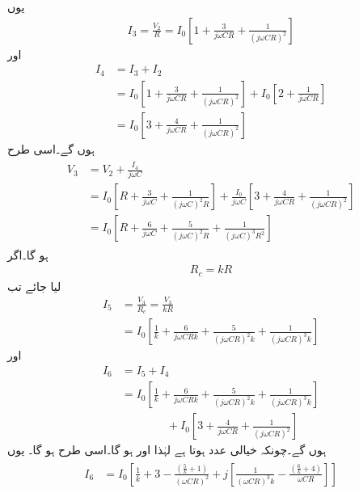 یوں
\begin{align*}
I_3=\frac{V_2}{R}=I_0 \left [1+\frac{3}{j \omega C R}+\frac{1}{\left(j \omega C R \right )^2} \right ]
\end{align*}
اور
\begin{align*}
I_4 &=I_3 +I_2\\
&=I_0 \left [1+\frac{3}{j \omega C R}+\frac{1}{\left(j \omega C R \right )^2} \right ]+I_0 \left [2+\frac{1}{j \omega C R} \right] \\
&=I_0 \left[3+\frac{4}{j \omega C R}+\frac{1}{\left (j \omega C R \right )^2} \right]
\end{align*}
ہوں گے۔اسی طرح
\begin{gather}
\begin{aligned} \label{مساوات_مزاحمت_کپیسٹر_دباو_تین}
V_3 &=V_2 +\frac{I_4}{j \omega C} \\
&=I_0 \left [R+\frac{3}{j \omega C} +\frac{1}{\left(j \omega C \right )^2 R}\right ]+ \frac{I_0}{j \omega C} \left[3+\frac{4}{j \omega C R}+\frac{1}{\left (j \omega C R \right )^2} \right] \\
&=I_0 \left[R+\frac{6}{j \omega C}+\frac{5}{\left(j \omega C \right )^2 R} +\frac{1}{\left(j \omega C \right )^3 R^2}\right]
\end{aligned}
\end{gather}
ہو گا۔اگر
\begin{align}
R_c = k R
\end{align}
لیا جائے تب
\begin{align*}
I_5 &= \frac{V_3}{R_c} =\frac{V_3}{k R}\\ 
&= I_0 \left[\frac{1}{k}+\frac{6}{j \omega C R k}+\frac{5}{\left(j \omega C  R\right )^2 k} +\frac{1}{\left(j \omega C  R\right )^3 k}\right]
\end{align*}
اور
\begin{align*}
I_6 &=I_5 + I_4 \\
&=I_0 \left[\frac{1}{k}+\frac{6}{j \omega C R k}+\frac{5}{\left(j \omega C  R\right )^2 k} +\frac{1}{\left(j \omega C  R\right )^3 k}\right] \\
& \qquad \qquad +I_0 \left[3+\frac{4}{j \omega C R}+\frac{1}{\left (j \omega C R \right )^2} \right]
\end{align*}
ہوں گے۔چونکہ خیالی عدد  ہوتا ہے لہٰذا  اور  ہو گا۔اسی طرح  ہو گا۔ یوں
\begin{gather}
\begin{aligned} \label{مساوات_مزاحمت_کپیسٹر_بار_کی_رو}
I_6&=I_0 \left[ \frac{1}{k}+3 -\frac{\left(\frac{5}{k}+1 \right )}{\left(\omega C R \right)^2}+j \left [\frac{1}{\left (\omega C R \right)^3 k}  -\frac{\left(\frac{6}{k}+4 \right)}{\omega C R}\right] \right ]
\end{aligned}
\end{gather}
